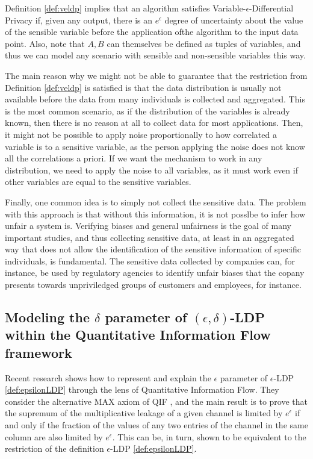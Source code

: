 \documentclass[conference]{IEEEtran}
\begin{document}
Definition \ref{def:veldp} implies that an algorithm satisfies Variable-$\epsilon$-Differential Privacy if, given any output, there is an $e^\epsilon$ degree of uncertainty about the value of the sensible variable before the application ofthe algorithm to the input data point. Also, note that $A,B$ can themselves be defined as tuples of variables, and thus we can model any scenario with sensible and non-sensible variables this way.

The main reason why we might not be able to guarantee that the restriction from Definition \ref{def:veldp} is satisfied is that the data distribution is usually not available before the data from many individuals is collected and aggregated. This is the most common scenario, as if the distribution of the variables is already known, then there is no reason at all to collect data for most applications. Then, it might not be possible to apply noise proportionally to how correlated a variable is to a sensitive variable, as the person applying the noise does not know all the correlations a priori. If we want the mechanism to work in any distribution, we need to apply the noise to all variables, as it must work even if other variables are equal to the sensitive variables.

Finally, one common idea is to simply not collect the sensitive data. The problem with this approach is that without this information, it is not posslbe to infer how unfair a system is. Verifying biases and general unfairness is the goal of many important studies, and thus collecting sensitive data, at least in an aggregated way that does not allow the identification of the sensitive information of specific individuals, is fundamental. The sensitive data collected by companies can, for instance, be used by regulatory agencies to identify unfair biases that the copany presents towards unpriviledged groups of customers and employees, for instance.

\subsection{Modeling the $\delta$ parameter of $(\epsilon,\delta)$-LDP within the Quantitative Information Flow framework}\label{subsec:ldeltap}

Recent research \cite{fernandes2024explaining} shows how to represent and explain the $\epsilon$ parameter of $\epsilon$-LDP \ref{def:epsilonLDP} through the lens of Quantitative Information Flow. They consider the alternative MAX axiom of QIF \cite[Chapter~11]{QIF}, and the main result is to prove that the supremum of the multiplicative leakage of a given channel is limited by $e^\epsilon$ if and only if the fraction of the values of any two entries of the channel in the same column are also limited by $e^\epsilon$. This can be, in turn, shown to be equivalent to the restriction of the definition $\epsilon$-LDP \ref{def:epsilonLDP}.
\end{document}
